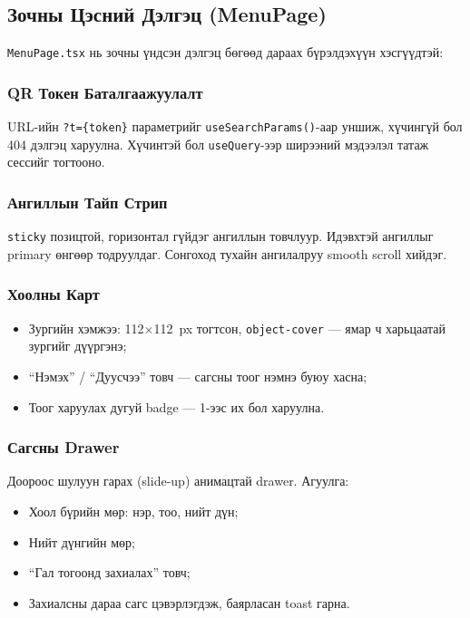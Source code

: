 \documentclass[12pt,a4paper]{article}
\begin{document}
\subsection{Зочны Цэсний Дэлгэц (MenuPage)}

\texttt{MenuPage.tsx} нь зочны үндсэн дэлгэц бөгөөд дараах
бүрэлдэхүүн хэсгүүдтэй:

\subsubsection{QR Токен Баталгаажуулалт}
URL-ийн \texttt{?t=\{token\}} параметрийг \texttt{useSearchParams()}-аар
уншиж, хүчингүй бол 404 дэлгэц харуулна. Хүчинтэй бол
\texttt{useQuery}-ээр ширээний мэдээлэл татаж сессийг тогтооно.

\subsubsection{Ангиллын Тайп Стрип}
\texttt{sticky} позицтой, горизонтал гүйдэг ангиллын товчлуур.
Идэвхтэй ангиллыг primary өнгөөр тодруулдаг. Сонгоход
тухайн ангилалруу smooth scroll хийдэг.

\subsubsection{Хоолны Карт}
\begin{itemize}
  \item Зургийн хэмжээ: 112$\times$112~px тогтсон,
        \texttt{object-cover} --- ямар ч харьцаатай зургийг
        дүүргэнэ;
  \item ``Нэмэх'' / ``Дуусчээ'' товч --- сагсны тоог нэмнэ
        буюу хасна;
  \item Тоог харуулах дугуй badge --- 1-ээс их бол харуулна.
\end{itemize}

\subsubsection{Сагсны Drawer}
Доороос шулуун гарах (slide-up) анимацтай drawer. Агуулга:
\begin{itemize}
  \item Хоол бүрийн мөр: нэр, тоо, нийт дүн;
  \item Нийт дүнгийн мөр;
  \item ``Гал тогоонд захиалах'' товч;
  \item Захиалсны дараа сагс цэвэрлэгдэж, баярласан toast гарна.
\end{itemize}
\end{document}
